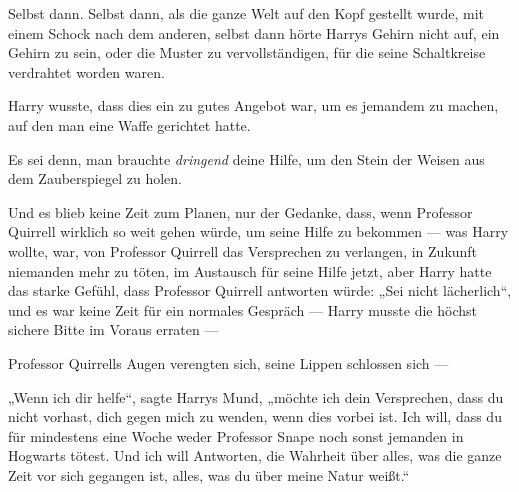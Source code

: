 \later


Selbst dann. Selbst dann, als die ganze Welt auf den Kopf gestellt wurde, mit einem Schock nach dem anderen, selbst dann hörte Harrys Gehirn nicht auf, ein Gehirn zu sein, oder die Muster zu vervollständigen, für die seine Schaltkreise verdrahtet worden waren.

Harry wusste, dass dies ein zu gutes Angebot war, um es jemandem zu machen, auf den man eine Waffe gerichtet hatte.

Es sei denn, man brauchte \emph{dringend} deine Hilfe, um den Stein der Weisen aus dem Zauberspiegel zu holen.

Und es blieb keine Zeit zum Planen, nur der Gedanke, dass, wenn Professor Quirrell wirklich so weit gehen würde, um seine Hilfe zu bekommen — was Harry wollte, war, von Professor Quirrell das Versprechen zu verlangen, in Zukunft niemanden mehr zu töten, im Austausch für seine Hilfe jetzt, aber Harry hatte das starke Gefühl, dass Professor Quirrell antworten würde:
„Sei nicht lächerlich“, und es war keine Zeit für ein normales Gespräch — Harry musste die höchst sichere Bitte im Voraus erraten —

Professor Quirrells Augen verengten sich, seine Lippen schlossen sich —

„Wenn ich dir helfe“, sagte Harrys Mund, „möchte ich dein Versprechen, dass du nicht vorhast, dich gegen mich zu wenden, wenn dies vorbei ist. Ich will, dass du für mindestens eine Woche weder Professor Snape noch sonst jemanden in Hogwarts tötest. Und ich will Antworten, die Wahrheit über alles, was die ganze Zeit vor sich gegangen ist, alles, was du über meine Natur weißt.“


